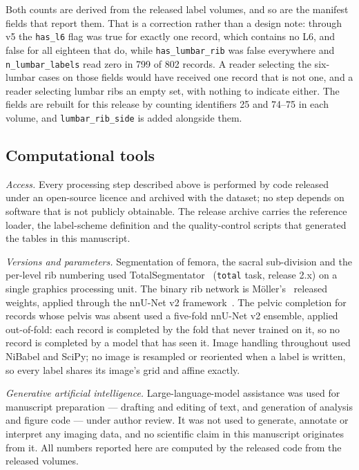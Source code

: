\documentclass[aapm,mph,amsmath,amssymb,reprint,linenumbers]{revtex4-2}
\begin{document}
Both counts are derived from the released label volumes, and so are the manifest fields
that report them. That is a correction rather than a design note: through v5 the
\texttt{has\_l6} flag was true for exactly one record, which contains no L6, and false for
all eighteen that do, while \texttt{has\_lumbar\_rib} was false everywhere and
\texttt{n\_lumbar\_labels} read zero in 799 of 802 records. A reader selecting the six-lumbar
cases on those fields would have received one record that is not one, and a reader selecting
lumbar ribs an empty set, with nothing to indicate either. The fields are rebuilt for this
release by counting identifiers 25 and 74--75 in each volume, and
\texttt{lumbar\_rib\_side} is added alongside them.

\subsection{Computational tools}

\emph{Access.} Every processing step described above is performed by code released under an
open-source licence and archived with the dataset; no step depends on software that is not
publicly obtainable. The release archive carries the reference loader, the label-scheme
definition and the quality-control scripts that generated the tables in this manuscript.

\emph{Versions and parameters.} Segmentation of femora, the sacral sub-division and the
per-level rib numbering used TotalSegmentator~\cite{totalsegmentator} (\texttt{total} task,
release 2.x) on a single graphics processing unit. The binary rib network is
M\"oller's~\cite{ribseg} released weights, applied through the nnU-Net v2
framework~\cite{nnunet}. The pelvic completion for records whose pelvis was absent used a
five-fold nnU-Net v2 ensemble, applied out-of-fold: each record is completed by the fold that
never trained on it, so no record is completed by a model that has seen it. Image handling
throughout used NiBabel and SciPy; no image is resampled or reoriented when a label is
written, so every label shares its image's grid and affine exactly.

\emph{Generative artificial intelligence.} Large-language-model assistance was used for
manuscript preparation --- drafting and editing of text, and generation of analysis and
figure code --- under author review. It was not used to generate, annotate or interpret any
imaging data, and no scientific claim in this manuscript originates from it. All numbers
reported here are computed by the released code from the released volumes.
\end{document}
